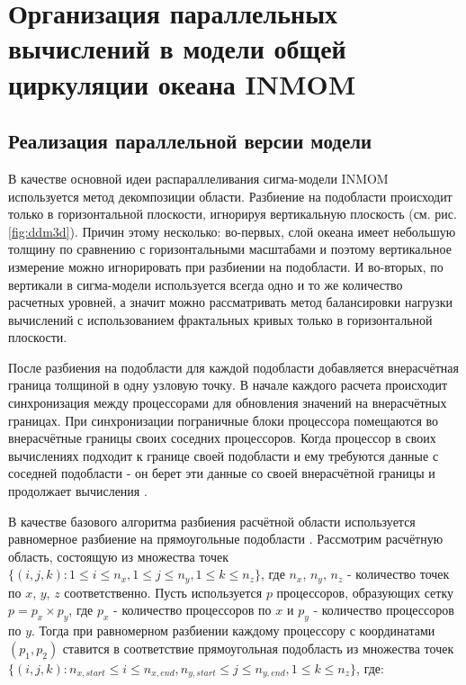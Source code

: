 \chapter{Организация параллельных вычислений в модели общей циркуляции океана INMOM}\label{ch:inmsom/ch2}

\section{Реализация параллельной версии модели}\label{sec:inmsom/ch2/sec1}
    В качестве основной идеи распараллеливания сигма-модели INMOM используется метод декомпозиции области.
    Разбиение на подобласти происходит только в горизонтальной плоскости, игнорируя вертикальную плоскость (см. рис. \ref{fig:ddm3d}). 
    Причин этому несколько: во-первых, слой океана имеет небольшую толщину по сравнению с горизонтальными масштабами и поэтому вертикальное измерение можно игнорировать
	при разбиении на подобласти.
	И во-вторых, по вертикали в сигма-модели используется всегда одно и то же количество
	расчетных уровней, а значит можно рассматривать метод балансировки нагрузки вычислений с использованием фрактальных кривых только в горизонтальной плоскости.

    После разбиения на подобласти для каждой подобласти добавляется внерасчётная граница толщиной в одну узловую точку. 
    В начале каждого расчета происходит синхронизация между процессорами для обновления значений на внерасчётных границах.
    При синхронизации пограничные блоки процессора помещаются во внерасчётные границы своих соседних процессоров.
    Когда процессор в своих вычислениях подходит к границе своей подобласти и ему требуются данные с соседней подобласти - он берет эти данные 
    со своей внерасчётной границы и продолжает вычисления \cite{GuansuoWang}.
   
    
    В качестве базового алгоритма разбиения расчётной области используется равномерное разбиение на прямоугольные подобласти \cite{ChaplyginINMOM2017}.     
    Рассмотрим расчётную область, состоящую из множества точек $\{ (i, j, k) : 1 \leq i \leq n_x,  1 \leq j \leq n_y, 1 \leq k \leq n_z \}$,
    где $n_x$, $n_y$, $n_z$ - количество точек по $x$, $y$, $z$ соответственно. 
    Пусть используется $p$ процессоров, образующих сетку $p = p_{x} \times p_{y}$,
    где $p_x$ - количество процессоров по $x$ и $p_y$ - количество процессоров по $y$. 
    Тогда при равномерном разбиении каждому процессору с координатами $(p_1, p_2)$ ставится в соответствие прямоугольная подобласть из множества точек
    $\{ (i, j, k) :  n_{x, start} \leq i \leq n_{x, end} , n_{y, start} \leq j \leq n_{y, end}, 1 \leq k \leq n_z \}$, где:  
    
